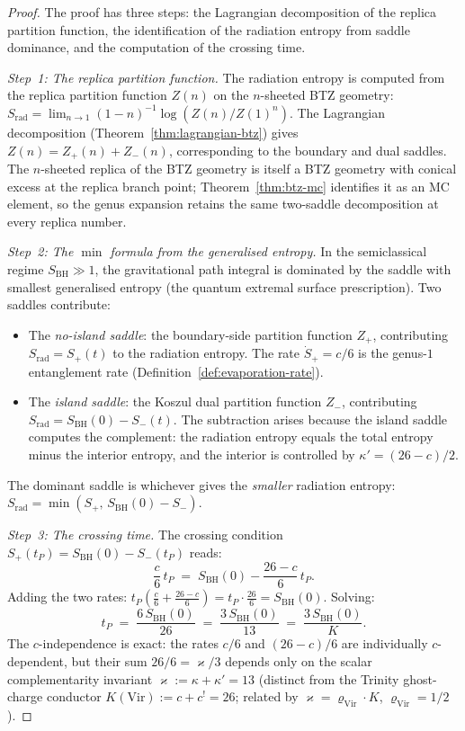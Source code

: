 \documentclass[11pt,reqno]{amsart}
\theoremstyle{definition}
\theoremstyle{remark}
\providecommand{\Vir}{\mathrm{Vir}}
\begin{document}
\begin{proof}
The proof has three steps: the Lagrangian decomposition of the
replica partition function, the identification of the radiation
entropy from saddle dominance, and the computation of the
crossing time.

\medskip
\noindent\textit{Step~1: The replica partition function.}
The radiation entropy is computed from the replica partition
function $Z(n)$ on the $n$-sheeted BTZ geometry:
$S_{\mathrm{rad}}
= \lim_{n \to 1}(1-n)^{-1}\log(Z(n)/Z(1)^n)$.
The Lagrangian decomposition
(Theorem~\ref{thm:lagrangian-btz}) gives
$Z(n) = Z_+(n) + Z_-(n)$, corresponding to the boundary and
dual saddles. The $n$-sheeted replica of the BTZ geometry is
itself a BTZ geometry with conical excess at the replica branch
point; Theorem~\ref{thm:btz-mc} identifies it as an MC
element, so the genus expansion retains the same two-saddle
decomposition at every replica number.

\medskip
\noindent\textit{Step~2: The $\min$ formula from the generalised
entropy.}
In the semiclassical regime $S_{\mathrm{BH}} \gg 1$, the
gravitational path integral is dominated by the saddle with
smallest generalised entropy (the quantum extremal surface
prescription). Two saddles contribute:
\begin{itemize}
\item The \emph{no-island saddle}: the boundary-side partition
  function $Z_+$, contributing
  $S_{\mathrm{rad}} = S_+(t)$ to the radiation entropy.
  The rate $\dot{S}_+ = c/6$ is the genus-$1$
  entanglement rate
  (Definition~\ref{def:evaporation-rate}).
\item The \emph{island saddle}: the Koszul dual partition
  function $Z_-$, contributing
  $S_{\mathrm{rad}} = S_{\mathrm{BH}}(0) - S_-(t)$.
  The subtraction arises because the island saddle computes
  the complement: the radiation entropy equals the total entropy
  minus the interior entropy, and the interior is controlled
  by $\kappa' = (26-c)/2$.
\end{itemize}
The dominant saddle is whichever gives the
\emph{smaller} radiation entropy:
$S_{\mathrm{rad}} = \min(S_+,\,S_{\mathrm{BH}}(0) - S_-)$.

\medskip
\noindent\textit{Step~3: The crossing time.}
The crossing condition
$S_+(t_P) = S_{\mathrm{BH}}(0) - S_-(t_P)$ reads:
\[
\frac{c}{6}\,t_P
\;=\;
S_{\mathrm{BH}}(0) - \frac{26-c}{6}\,t_P.
\]
Adding the two rates:
$t_P\!\left(\frac{c}{6} + \frac{26-c}{6}\right)
= t_P \cdot \frac{26}{6} = S_{\mathrm{BH}}(0)$.
Solving:
\[
t_P
\;=\;
\frac{6\,S_{\mathrm{BH}}(0)}{26}
\;=\;
\frac{3\,S_{\mathrm{BH}}(0)}{13}
\;=\;
\frac{3\,S_{\mathrm{BH}}(0)}{K}.
\]
The $c$-independence is exact: the rates $c/6$ and $(26-c)/6$
are individually $c$-dependent, but their sum
$26/6 = \varkappa/3$ depends only on the scalar complementarity
invariant $\varkappa := \kappa + \kappa' = 13$ (distinct from the
Trinity ghost-charge conductor $K(\Vir) := c + c^! = 26$; related
by $\varkappa = \varrho_{\Vir}\cdot K$, $\varrho_{\Vir} = 1/2$).
\end{proof}
\end{document}
